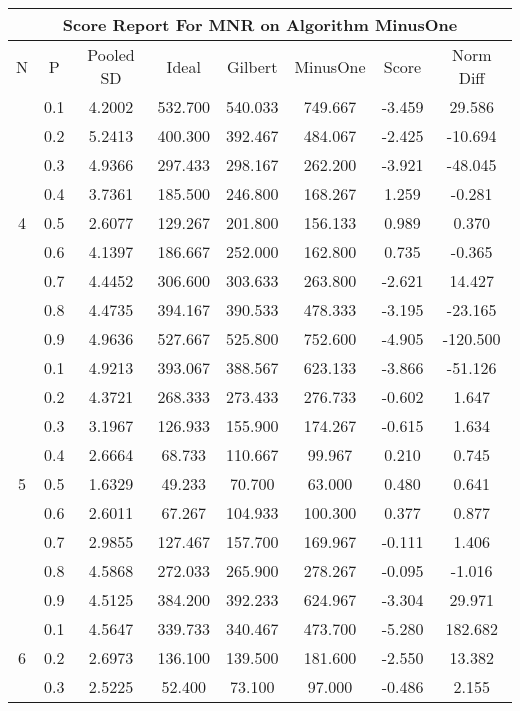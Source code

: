 \documentclass[11pt,a4paper]{report}
\begin{document}
\begin{longtable}{ | c | c || c | c | c | c | c | c | }
\hline
\multicolumn{8}{|c|}{ Score Report For MNR on Algorithm MinusOne} \\
\hline
N & P & Pooled SD &  Ideal &  Gilbert & MinusOne  & Score & Norm Diff \\
 \hline
 \hline
 \endhead
\multirow{9}{*}{4} & 0.1 & 4.2002 & 532.700 & 540.033 & 749.667 & -3.459 & 29.586 \\
 & 0.2 & 5.2413 & 400.300 & 392.467 & 484.067 & -2.425 & -10.694 \\
 & 0.3 & 4.9366 & 297.433 & 298.167 & 262.200 & -3.921 & -48.045 \\
 & 0.4 & 3.7361 & 185.500 & 246.800 & 168.267 & 1.259 & -0.281 \\
 & 0.5 & 2.6077 & 129.267 & 201.800 & 156.133 & 0.989 & 0.370 \\
 & 0.6 & 4.1397 & 186.667 & 252.000 & 162.800 & 0.735 & -0.365 \\
 & 0.7 & 4.4452 & 306.600 & 303.633 & 263.800 & -2.621 & 14.427 \\
 & 0.8 & 4.4735 & 394.167 & 390.533 & 478.333 & -3.195 & -23.165 \\
 & 0.9 & 4.9636 & 527.667 & 525.800 & 752.600 & -4.905 & -120.500 \\
 \hline
\multirow{9}{*}{5} & 0.1 & 4.9213 & 393.067 & 388.567 & 623.133 & -3.866 & -51.126 \\
 & 0.2 & 4.3721 & 268.333 & 273.433 & 276.733 & -0.602 & 1.647 \\
 & 0.3 & 3.1967 & 126.933 & 155.900 & 174.267 & -0.615 & 1.634 \\
 & 0.4 & 2.6664 & 68.733 & 110.667 & 99.967 & 0.210 & 0.745 \\
 & 0.5 & 1.6329 & 49.233 & 70.700 & 63.000 & 0.480 & 0.641 \\
 & 0.6 & 2.6011 & 67.267 & 104.933 & 100.300 & 0.377 & 0.877 \\
 & 0.7 & 2.9855 & 127.467 & 157.700 & 169.967 & -0.111 & 1.406 \\
 & 0.8 & 4.5868 & 272.033 & 265.900 & 278.267 & -0.095 & -1.016 \\
 & 0.9 & 4.5125 & 384.200 & 392.233 & 624.967 & -3.304 & 29.971 \\
 \hline
\multirow{9}{*}{6} & 0.1 & 4.5647 & 339.733 & 340.467 & 473.700 & -5.280 & 182.682 \\
 & 0.2 & 2.6973 & 136.100 & 139.500 & 181.600 & -2.550 & 13.382 \\
 & 0.3 & 2.5225 & 52.400 & 73.100 & 97.000 & -0.486 & 2.155 \\

\end{longtable}
\end{document}
